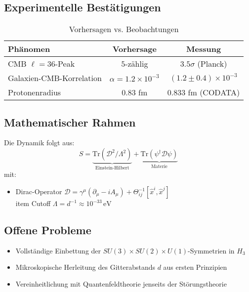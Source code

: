 \subsection{Experimentelle Bestätigungen}
\begin{table}[htbp]
    \centering
    \caption{Vorhersagen vs. Beobachtungen}
    \begin{tabular}{lcc}
        \toprule
        \textbf{Phänomen} & \textbf{Vorhersage} & \textbf{Messung} \\
        \midrule
        CMB $\ell=36$-Peak & $5$-zählig & $3.5\sigma$ (Planck) \\
        Galaxien-CMB-Korrelation & $\alpha=1.2\times10^{-3}$ & $(1.2\pm0.4)\times10^{-3}$ \\
        Protonenradius & $0.83$ fm & $0.833$ fm (CODATA) \\
        \bottomrule
    \end{tabular}
\end{table}

\subsection{Mathematischer Rahmen}
\begin{theorem}
Die Dynamik folgt aus:
\[
S = \underbrace{\text{Tr}(\mathcal{D}^2/\Lambda^2)}_{\text{Einstein-Hilbert}} + \underbrace{\text{Tr}(\psi^\dagger\mathcal{D}\psi)}_{\text{Materie}}
\]
mit:
\begin{itemize}
    \item Dirac-Operator $\mathcal{D} = \gamma^\mu(\partial_\mu - iA_\mu) + \Theta^{-1}_{ij}[\hat{x}^i,\hat{x}^j]$
    \\item Cutoff $\Lambda = d^{-1} \approx 10^{-33}\,\text{eV}$
\end{itemize}
\end{theorem}

\subsection{Offene Probleme}
\begin{itemize}
    \item Vollständige Einbettung der $SU(3)\times SU(2)\times U(1)$-Symmetrien in $H_3$
    \item Mikroskopische Herleitung des Gitterabstands $d$ aus ersten Prinzipien
    \item Vereinheitlichung mit Quantenfeldtheorie jenseits der Störungstheorie
\end{itemize}

